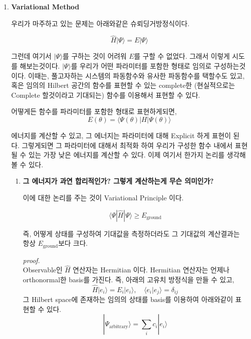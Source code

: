 \documentclass[10pt]{article}
\begin{document}
\begin{enumerate}[label=2)]
\item {\Large \textbf{Variational Method}}

우리가 마주하고 있는 문제는 아래와같은 슈뢰딩거방정식이다.

\[
\hat{H}|\Psi\rangle = E|\Psi\rangle
\]

그런데 여기서 $|\Psi\rangle$를 구하는 것이 어려워 $E$를 구할 수 없었다. 
그래서 이렇게 시도를 해보는것이다. $|\Psi\rangle$를 우리가 어떤 파라미터를 포함한 형태로 임의로 구성하는것이다. 
이때는, 풀고자하는 시스템의 파동함수와 유사한 파동함수를 택할수도 있고,
혹은 임의의 Hilbert 공간의 함수를 표현할 수 있는 complete한 (현실적으로는 Complete 할것이라고 기대되는) 함수를 이용해서 표현할 수 있다.

어떻게든 함수를 파라미터를 포함한 형태로 표현하게되면,
\[
E(\theta) = \langle \Psi(\theta) | H | \Psi(\theta) \rangle
\]

에너지를 계산할 수 있고, 그 에너지는 파라미터에 대해 Explicit 하게 표현이 된다. 
그렇게되면 그 파라미터에 대해서 최적화 하여 우리가 구성한 함수 내에서 표현될 수 있는 가장 낮은 에너지를 계산할 수 있다. 
이제 여기서 한가지 논리를 생각해볼 수 있다.

\begin{enumerate}[label=*]
\item  \textbf{그 에너지가 과연 합리적인가? 그렇게 계산하는게 무슨 의미인가?}

이에 대한 논리를 주는 것이 Variational Principle 이다.

\begin{tcolorbox}[enhanced, breakable, colback=gray!10, colframe=black, title=Definition: Variation Principle]

\[
\langle \Psi | \hat{H} | \Psi \rangle \geq E_{\text{ground}}
\]

즉, 어떻게 상태를 구성하여 기대값을 측정하더라도 그 기대값의 계산결과는 항상 $E_{\text{ground}}$보다 크다.

\end{tcolorbox}

\begin{mdframed}
\textit{proof.} \\
Observable인 $\hat{H}$ 연산자는 Hermitian 이다. Hermitian 연산자는 언제나 orthonormal한 basis를 가진다. 즉, 아래의 고유치 방정식을 만들 수 있고,
\[
\hat{H} |e_i \rangle = E_i |e_i \rangle, \quad \langle e_i | e_j \rangle = \delta_{ij}
\]
그 Hilbert space에 존재하는 임의의 상태를 basis를 이용하여 아래와같이 표현할 수 있다.
\[
|\Psi_{\text{arbitrary}}\rangle = \sum_i c_i |e_i\rangle \tag{1}
\]


\end{mdframed}
\end{enumerate}
\end{enumerate}
\end{document}
